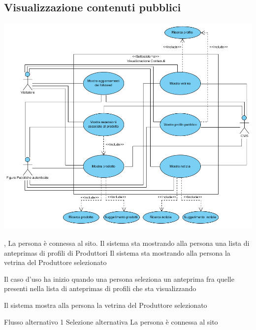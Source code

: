\subsection{Visualizzazione contenuti pubblici}
\begin{center}
   \includegraphics[width=\textwidth]{assets/visualParadigm/cu/Visualizzazione}
\end{center}
{, }
{La persona è connessa al sito. Il sistema sta mostrando alla persona una lista di \glspl{anteprima} di profili di Produttori}
{Il sistema sta mostrando alla persona la vetrina del Produttore selezionato}
{\begin{enumCU}
	\item Il caso d'uso ha inizio quando una persona seleziona un \gls{anteprima} fra quelle presenti nella lista di \glspl{anteprima} di profili che sta visualizzando\label{cu:mostraVetr1}
	\item Il sistema mostra alla persona la vetrina del Produttore selezionato
\end{enumCU}
}
%
%
{Flusso alternativo 1}%
{Selezione alternativa}%
{La persona è connessa al sito}%
